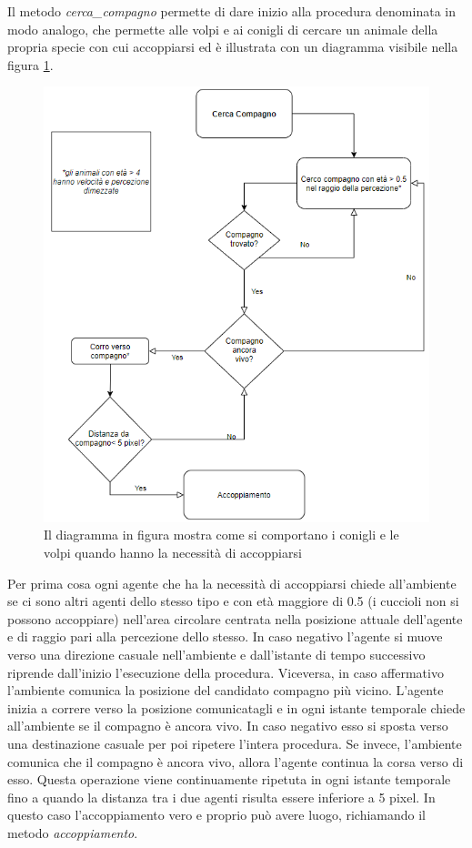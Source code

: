 \documentclass[11pt]{article}
\begin{document}
Il metodo \emph{cerca\_compagno} permette di dare inizio alla procedura denominata in modo analogo, che permette alle volpi e ai conigli di cercare un animale della propria specie con cui accoppiarsi ed è illustrata con un diagramma visibile nella figura \ref{fig:diagrammaAccoppiamento}.
\begin{figure}
     \centering
     \includegraphics[scale = 0.75]{Cerca_Compagno.PNG}
     \caption{Il diagramma in figura mostra come si comportano i conigli e le volpi quando hanno la necessità di accoppiarsi}
     \label{fig:diagrammaAccoppiamento}
\end{figure}
Per prima cosa ogni agente che ha la necessità di accoppiarsi chiede all'ambiente se ci sono altri agenti dello stesso tipo e con età maggiore di 0.5 (i cuccioli non si possono accoppiare) nell'area circolare centrata nella posizione attuale dell'agente e di raggio pari alla percezione dello stesso.
In caso negativo l'agente si muove verso una direzione casuale nell'ambiente e dall'istante di tempo successivo riprende dall'inizio l'esecuzione della procedura. Viceversa, in caso affermativo l'ambiente comunica la posizione del candidato compagno più vicino. L'agente inizia a correre verso la posizione comunicatagli e in ogni istante temporale chiede all'ambiente se il compagno è ancora vivo. In caso negativo esso si sposta verso una destinazione casuale per poi ripetere l'intera procedura. Se invece, l'ambiente comunica che il compagno è ancora vivo, allora l'agente continua la corsa verso di esso. Questa operazione viene continuamente ripetuta in ogni istante temporale fino a quando la distanza tra i due agenti risulta essere inferiore a 5 pixel. In questo caso l'accoppiamento vero e proprio può avere luogo, richiamando il metodo \emph{accoppiamento}. 
\end{document}
